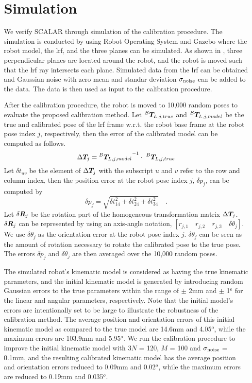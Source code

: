 \section{Simulation}
\label{sec:simulation}

We verify SCALAR through simulation of the calibration procedure. The simulation is conducted by using Robot Operating System and Gazebo where the robot model, the \ac{lrf}, and the three planes can be simulated.  
As shown in , three perpendicular planes are located around the robot, and the robot is moved such that the \ac{lrf} ray intersects each plane. Simulated data from the \ac{lrf} can be obtained and Gaussian noise with zero mean and standar deviation $\sigma_{\rm{noise}}$ can be added to the data. The data is then used as input to the calibration procedure. 

After the calibration procedure, the robot is moved to 10,000 random poses to evaluate the proposed calibration method. Let ${^B}\vb*{T}_{L,j,true}$ and ${^B}\vb*{T}_{L,j,model}$ be the true and calibrated pose of the \ac{lrf} frame w.r.t. the robot base frame at the robot pose index $j$, respectively, then the error of the calibrated model can be computed as follows. 
\begin{equation}
\Delta \vb*{T}_j =  {{^B}\vb*{T}_{L,j,model}}^{-1} \cdot\; {^B}\vb*{T}_{L,j,true}
\end{equation}
Let $\delta t_{uv}$ be the element of $\Delta \vb*{T}_j$ with the subscript $u$ and $v$ refer to the row and column index, then the position error at the robot pose index $j$, $\delta p_j$, can be computed by
\begin{equation}
\delta p_j = \sqrt{\delta t_{14}^2 + \delta t_{24}^2 + \delta t_{34}^2} \quad .
\end{equation}
Let $\delta \vb*{R}_j$ be the rotation part of the homogeneous transformation matrix $\Delta \vb*{T}_j$. $\delta \vb*{R}_j$ can be represented by using an axis-angle notation, $[r_{j,1}\quad r_{j,2}\quad r_{j,3}\quad \delta \theta_j]$. We use $\delta\theta_j$ as the orientation error at the robot pose index $j$.  $\delta\theta_j$ can be seen as the amount of rotation necessary to rotate the calibrated pose to the true pose. The errors $\delta p_j$ and $\delta\theta_j$ are then averaged over the 10,000 random poses.

The simulated robot's kinematic model is considered as having the true kinematic parameters, and the initial kinematic model is generated by introducing random Gaussian errors to the true parameters within the range of $\pm$ 2mm and $\pm$ 1$^o$ for the linear and angular parameters, respectively. Note that the initial model's errors are intentionally set to be large to illustrate the robustness of the calibration method. The average position and orientation errors of this initial kinematic model as compared to the true model are 14.6mm and 4.05$^o$, while the maximum errors are 103.9mm and 5.95$^o$. We run the calibration procedure to improve the initial kinematic model with $3N$ = 120, $M$ = 100 and $\sigma_{\rm{noise}}$ = 0.1mm, and the resulting calibrated kinematic model has the average position and orientation errors reduced to 0.09mm and 0.02$^o$, while the maximum errors are reduced to 0.19mm and 0.035$^o$.


